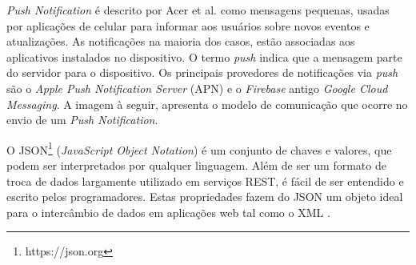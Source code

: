 \textit{Push Notification} é descrito por Acer et al. \cite{Acer:2015:EES:2902314.2902344} como mensagens pequenas, usadas por aplicações de celular para informar aos usuários sobre novos eventos e atualizações. As notificações na maioria dos casos, estão associadas aos aplicativos instalados no dispositivo. O termo \textit{push} indica que a mensagem parte do servidor para o dispositivo. Os principais provedores de notificações via \textit{push} são o \textit{Apple Push Notification Server} (APN) e o \textit{Firebase} antigo \textit{Google Cloud Messaging}. A imagem à seguir, apresenta o modelo de comunicação que ocorre no envio de um \textit{Push Notification}.\par

O JSON\footnote{https://json.org} (\textit{JavaScript Object Notation}) é um conjunto de chaves e valores, que podem
ser interpretados por qualquer linguagem. Além de ser um formato de troca de dados largamente utilizado em serviços REST, é fácil de ser entendido e escrito pelos programadores. Estas propriedades fazem do JSON um objeto ideal para o intercâmbio de dados em aplicações web tal como o XML \cite{jun_y_zhishu}.